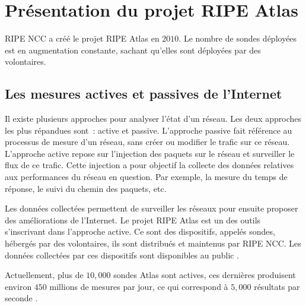 \section{Présentation du projet RIPE Atlas } \label{ripeatlassection}

RIPE NCC a créé le projet RIPE Atlas en $2010$. Le nombre de sondes déployées est en augmentation constante, sachant qu'elles sont déployées par des volontaires.

\subsection{Les mesures  actives et passives de l'Internet}

Il existe plusieurs approches pour analyser l'état  d'un réseau. Les deux approches les plus répandues sont~:  active et  passive. L'approche passive fait référence au processus de mesure d'un réseau, sans créer ou modifier le trafic sur ce réseau.   L'approche active  repose sur l'injection des paquets  sur le réseau et surveiller le flux de ce trafic. Cette injection a pour objectif la collecte  des données relatives aux performances du réseau en question. Par exemple, la mesure du temps de réponse, le suivi du chemin des paquets, etc. 

Les données collectées permettent de surveiller les réseaux pour ensuite  proposer des améliorations de l'Internet. Le projet RIPE Atlas est un des outils s'inscrivant dans l'approche active. Ce sont  des dispositifs, appelés sondes, hébergés par des volontaires, ils sont distribués et maintenus par  RIPE NCC. Les données collectées par ces dispositifs sont disponibles au public \cite{ripe-atlas-data}.

Actuellement,  plus de $10,000$ sondes Atlas sont actives, ces dernières produisent environ $450$ millions de mesures par jour, ce qui correspond à  $5,000$ résultats par seconde \cite{WinNT}.


